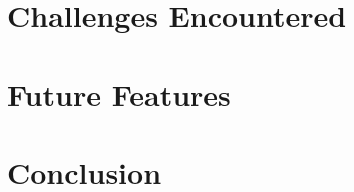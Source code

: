 \documentclass[pageno]{jpaper}
\begin{document}
\begin{doublespacing}


\hypertarget{sec:challenges_encountered}{}
\section{Challenges Encountered}

\section{Future Features}

\section{Conclusion}

\end{doublespacing} 


\end{document}
